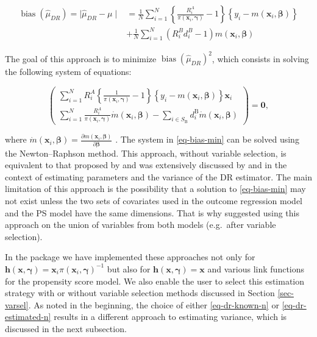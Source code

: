 \documentclass[
]{jss}
\begin{document}
\begin{equation}
\begin{aligned}
\operatorname{bias}\left(\hat{\mu}_{D R}\right) = \mid\hat{\mu}_{DR}-\mu\mid &=\frac{1}{N} \sum_{i=1}^N\left\{\frac{R_i^A}{\pi\left(\boldsymbol{x}_i, \boldsymbol{\gamma}\right)} - 1\right\}\left\{y_i-m\left(\boldsymbol{x}_i, \boldsymbol{\beta}\right)\right\}\\
& + \frac{1}{N} \sum_{i=1}^N\left(R_i^B d_i^B-1\right) m\left(\boldsymbol{x}_i, \boldsymbol{\beta}\right)
\end{aligned}
\label{eq-dr-bias}
\end{equation}

The goal of this approach is to minimize
\(\operatorname{bias}\left(\hat{\mu}_{D R}\right)^2\), which consists in
solving the following system of equations:

\begin{equation}
\left(\begin{array}{c}
\sum_{i=1}^N R_i^A\left\{\frac{1}{\pi\left(\boldsymbol{x}_i, \boldsymbol{\gamma}\right)}-1\right\}\left\{y_i-m\left(\boldsymbol{x}_i, \boldsymbol{\beta}\right)\right\} \boldsymbol{x}_i \\
\sum_{i=1}^N \frac{R_i^A}{\pi\left(\boldsymbol{x}_i, \boldsymbol{\gamma}\right)} \dot{m}\left(\boldsymbol{x}_i, \boldsymbol{\beta}\right) -\sum_{i \in S_{\mathrm{B}}} d_i^{\mathrm{B}} \dot{m}\left(\boldsymbol{x}_i, \boldsymbol{\beta}\right)
\end{array}\right) = \boldsymbol{0},
\label{eq-bias-min}
\end{equation}

where
\(\dot{m}\left(\boldsymbol{x}_i, \boldsymbol{\beta}\right)=\frac{\partial m\left(\boldsymbol{x}_i, \boldsymbol{\beta}\right)}{\partial \boldsymbol{\beta}}\)
. The system in \eqref{eq-bias-min} can be solved using the
Newton--Raphson method. This approach, without variable selection, is
equivalent to that proposed by \citet{kim2014doubly} and was extensively
discussed by \citet{chen2020doubly} and \citet{wu2022statistical} in the
context of estimating parameters and the variance of the DR estimator.
The main limitation of this approach is the possibility that a solution
to \eqref{eq-bias-min} may not exist unless the two sets of covariates
used in the outcome regression model and the PS model have the same
dimensions. That is why \citet{yang_doubly_2020} suggested using this
approach on the union of variables from both models (e.g.~after variable
selection).

In the  package we have implemented these approaches not
only for
\(\boldsymbol{h}(\boldsymbol{x}, \boldsymbol{\gamma})=\boldsymbol{x}_i \pi\left(\boldsymbol{x}_i, \boldsymbol{\gamma}\right)^{-1}\)
but also for
\(\boldsymbol{h}(\boldsymbol{x}, \boldsymbol{\gamma})=\boldsymbol{x}\)
and various link functions for the propensity score model. We also
enable the user to select this estimation strategy with or without
variable selection methods discussed in Section \ref{sec-varsel}. As
noted in the beginning, the choice of either \eqref{eq-dr-known-n} or
\eqref{eq-dr-estimated-n} results in a different approach to estimating
variance, which is discussed in the next subsection.
\end{document}
